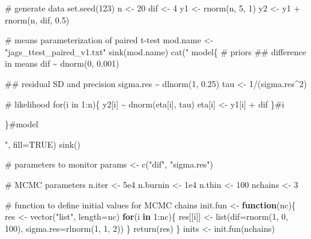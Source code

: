 \documentclass[
  13,
  letterpaper,
]{report}
\newenvironment{Shaded}{\begin{snugshade}}{\end{snugshade}}
\newcommand{\AttributeTok}[1]{\textcolor[rgb]{0.40,0.45,0.13}{#1}}
\newcommand{\CommentTok}[1]{\textcolor[rgb]{0.37,0.37,0.37}{#1}}
\newcommand{\ConstantTok}[1]{\textcolor[rgb]{0.56,0.35,0.01}{#1}}
\newcommand{\ControlFlowTok}[1]{\textcolor[rgb]{0.00,0.23,0.31}{\textbf{#1}}}
\newcommand{\DecValTok}[1]{\textcolor[rgb]{0.68,0.00,0.00}{#1}}
\newcommand{\FloatTok}[1]{\textcolor[rgb]{0.68,0.00,0.00}{#1}}
\newcommand{\FunctionTok}[1]{\textcolor[rgb]{0.28,0.35,0.67}{#1}}
\newcommand{\NormalTok}[1]{\textcolor[rgb]{0.00,0.23,0.31}{#1}}
\newcommand{\OtherTok}[1]{\textcolor[rgb]{0.00,0.23,0.31}{#1}}
\newcommand{\SpecialCharTok}[1]{\textcolor[rgb]{0.37,0.37,0.37}{#1}}
\newcommand{\StringTok}[1]{\textcolor[rgb]{0.13,0.47,0.30}{#1}}
\begin{document}
\begin{Shaded}
\begin{Highlighting}[]
\CommentTok{\# generate data}
\FunctionTok{set.seed}\NormalTok{(}\DecValTok{123}\NormalTok{)}
\NormalTok{n }\OtherTok{\textless{}{-}} \DecValTok{20}
\NormalTok{dif }\OtherTok{\textless{}{-}} \DecValTok{4}
\NormalTok{y1 }\OtherTok{\textless{}{-}} \FunctionTok{rnorm}\NormalTok{(n, }\DecValTok{5}\NormalTok{, }\DecValTok{1}\NormalTok{)}
\NormalTok{y2 }\OtherTok{\textless{}{-}}\NormalTok{ y1 }\SpecialCharTok{+} \FunctionTok{rnorm}\NormalTok{(n, dif, }\FloatTok{0.5}\NormalTok{)}

\CommentTok{\# means parameterization of paired t{-}test}
\NormalTok{mod.name }\OtherTok{\textless{}{-}} \StringTok{"jags\_ttest\_paired\_v1.txt"}
\FunctionTok{sink}\NormalTok{(mod.name)}
\FunctionTok{cat}\NormalTok{(}\StringTok{"}
\StringTok{    model\{}
\StringTok{        \# priors}
\StringTok{        \#\# difference in means}
\StringTok{        dif \textasciitilde{} dnorm(0, 0.001)}

\StringTok{        \#\# residual SD and precision}
\StringTok{        sigma.res \textasciitilde{} dlnorm(1, 0.25)}
\StringTok{        tau \textless{}{-} 1/(sigma.res\^{}2)}

\StringTok{        \# likelihood}
\StringTok{        for(i in 1:n)\{}
\StringTok{            y2[i] \textasciitilde{} dnorm(eta[i], tau)}
\StringTok{            eta[i] \textless{}{-} y1[i] + dif}
\StringTok{        \}\#i}

\StringTok{    \}\#model}

\StringTok{"}\NormalTok{, }\AttributeTok{fill=}\ConstantTok{TRUE}\NormalTok{)}
\FunctionTok{sink}\NormalTok{()}

\CommentTok{\# parameters to monitor}
\NormalTok{params }\OtherTok{\textless{}{-}} \FunctionTok{c}\NormalTok{(}\StringTok{"dif"}\NormalTok{, }\StringTok{"sigma.res"}\NormalTok{)}

\CommentTok{\# MCMC parameters}
\NormalTok{n.iter }\OtherTok{\textless{}{-}} \FloatTok{5e4}
\NormalTok{n.burnin }\OtherTok{\textless{}{-}} \FloatTok{1e4}
\NormalTok{n.thin }\OtherTok{\textless{}{-}} \DecValTok{100}
\NormalTok{nchains }\OtherTok{\textless{}{-}} \DecValTok{3}

\CommentTok{\# function to define initial values for MCMC chains}
\NormalTok{init.fun }\OtherTok{\textless{}{-}} \ControlFlowTok{function}\NormalTok{(nc)\{}
\NormalTok{    res }\OtherTok{\textless{}{-}} \FunctionTok{vector}\NormalTok{(}\StringTok{"list"}\NormalTok{, }\AttributeTok{length=}\NormalTok{nc)}
    \ControlFlowTok{for}\NormalTok{(i }\ControlFlowTok{in} \DecValTok{1}\SpecialCharTok{:}\NormalTok{nc)\{}
\NormalTok{        res[[i]] }\OtherTok{\textless{}{-}} \FunctionTok{list}\NormalTok{(}\AttributeTok{dif=}\FunctionTok{rnorm}\NormalTok{(}\DecValTok{1}\NormalTok{, }\DecValTok{0}\NormalTok{, }\DecValTok{100}\NormalTok{),}
                         \AttributeTok{sigma.res=}\FunctionTok{rlnorm}\NormalTok{(}\DecValTok{1}\NormalTok{, }\DecValTok{1}\NormalTok{, }\DecValTok{2}\NormalTok{))}
\NormalTok{    \}}
    \FunctionTok{return}\NormalTok{(res)}
\NormalTok{\}}
\NormalTok{inits }\OtherTok{\textless{}{-}} \FunctionTok{init.fun}\NormalTok{(nchains)}


\end{Highlighting}
\end{Shaded}
\end{document}
